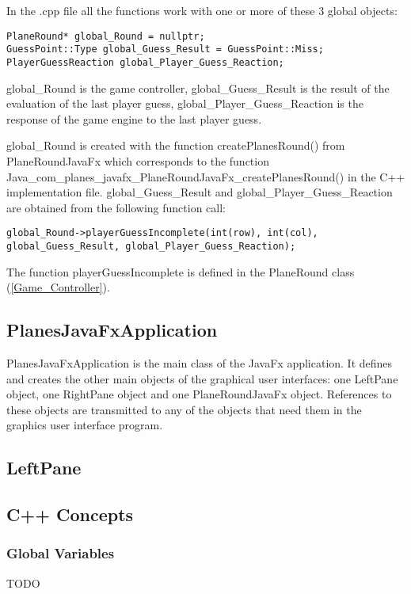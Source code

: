 In the .cpp file all the functions work with one or more of these 3 global objects:

\begin{lstlisting}
PlaneRound* global_Round = nullptr;
GuessPoint::Type global_Guess_Result = GuessPoint::Miss;
PlayerGuessReaction global_Player_Guess_Reaction;
\end{lstlisting}

global\_Round is the game controller, global\_Guess\_Result is the result of the evaluation of the last player guess, global\_Player\_Guess\_Reaction is the response of the game engine to the last player guess. 

global\_Round is created with the function createPlanesRound() from PlaneRoundJavaFx which corresponds to the function\\ Java\_com\_planes\_javafx\_PlaneRoundJavaFx\_createPlanesRound() in the C++ implementation file. global\_Guess\_Result and global\_Player\_Guess\_Reaction are obtained from the following function call:

\begin{lstlisting}
global_Round->playerGuessIncomplete(int(row), int(col), global_Guess_Result, global_Player_Guess_Reaction);
\end{lstlisting}

The function playerGuessIncomplete is defined in the PlaneRound class (\ref{Game_Controller}).

\subsection{PlanesJavaFxApplication}

PlanesJavaFxApplication is the main class of the JavaFx application. It defines and creates the other main objects of the graphical user interfaces: one LeftPane object, one RightPane object and one PlaneRoundJavaFx object. References to these objects are transmitted to any of the objects that need them in the graphics user interface program.  

\subsection{LeftPane}



\subsection{C++ Concepts}

\subsubsection{Global Variables} 

TODO